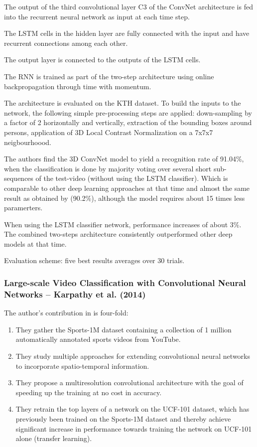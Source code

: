 The output of the third convolutional layer C3 of the ConvNet architecture is fed into the recurrent neural network as input at each time step.

The LSTM cells in the hidden layer are fully connected with the input and have recurrent connections among each other. 

The output layer is connected to the outputs of the LSTM cells.

The RNN is trained as part of the two-step architecture using online backpropagation through time with momentum.

The architecture is evaluated on the KTH dataset. To build the inputs to the network, the following simple pre-processing steps are applied: down-sampling by a factor of 2 horizontally and vertically, extraction of the bounding boxes around persons, application of 3D Local Contrast Normalization on a 7x7x7 neigbourhoood.

The authors find the 3D ConvNet model to yield a recognition rate of 91.04\%, when the classification is done by majority voting over several short sub-sequences of the test-video (without using the LSTM classifier).
Which is comparable to other deep learning approaches at that time and almost the same result as obtained by \textcite{ji_3d_2013} (90.2\%), although the model requires about 15 times less paramerters.

When using the LSTM classifier network, performance increases of about 3\%. The combined two-steps architecture consistently outperformed other deep models at that time.

Evaluation scheme: five best results averages over 30 trials.


\subsubsection{Large-scale Video Classification with Convolutional Neural Networks -- Karpathy et al. (2014)}

The author's contribution in \cite{karpathy_large-scale_2014} is four-fold:
\begin{enumerate}
    \item They gather the Sports-1M dataset containing a collection of 1 million automatically annotated sports videos from YouTube.
    \item They study multiple approaches for extending convolutional neural networks to incorporate spatio-temporal information.
    \item They propose a multiresolution convolutional architecture with the goal of speeding up the training at no cost in accuracy.
    \item They retrain the top layers of a network on the UCF-101 dataset, which has previously been trained on the Sports-1M dataset and thereby achieve significant increase in performance towards training the network on UCF-101 alone (transfer learning).
\end{enumerate}

